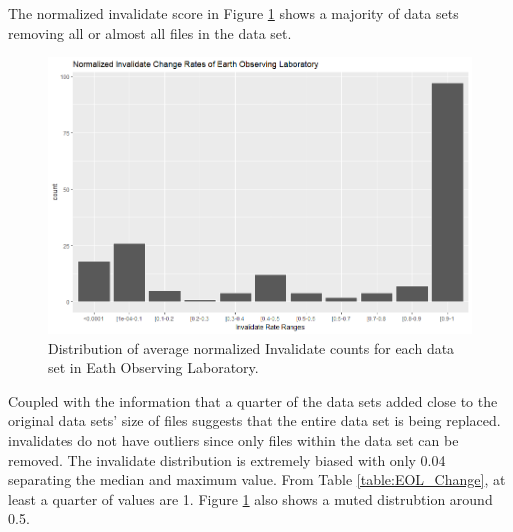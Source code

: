 The normalized \gls{invalidate} score in Figure \ref{EOL_Invs} shows a majority of data sets removing all or almost all files in the data set.
\begin{figure}%
	\centering
	\includegraphics[scale=.6]{figures/Eol_Inv.png}
	\caption{Distribution of average normalized Invalidate counts for each data set in Eath Observing Laboratory.}
	\label{EOL_Invs}
\end{figure}
Coupled with the information that a quarter of the data sets added close to the original data sets' size of files suggests that the entire data set is being replaced.
\Glspl{invalidate} do not have outliers since only files within the data set can be removed.
The \gls{invalidate} distribution is extremely biased with only 0.04 separating the median and maximum value.
From Table \ref{table:EOL_Change}, at least a quarter of values are 1.
Figure \ref{EOL_Invs} also shows a muted distrubtion around 0.5.

